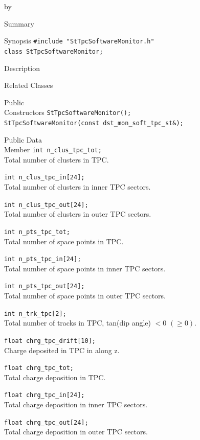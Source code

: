 \documentclass[twoside]{article}
\newcommand{\entrylabel}[1]{\mbox{\textbf{{#1}}}\hfil}%
\newenvironment{entry}
{\begin{list}{}%
    {\renewcommand{\makelabel}{\entrylabel}%
     \setlength{\labelwidth}{90pt}%
     \setlength{\leftmargin}{\labelwidth}
     \advance\leftmargin by \labelsep%
      }%
    }%
  {\end{list}}
\newcommand{\Entrylabel}[1]%
{\raisebox{0pt}[1ex][0pt]{\makebox[\labelwidth][l]%
    {\parbox[t]{\labelwidth}{\hspace{0pt}\textbf{{#1}}}}}}
\newenvironment{Entry}%
{\renewcommand{\entrylabel}{\Entrylabel}\begin{entry}}%
  {\end{entry}}
\begin{document}
\begin{Entry}
\item[Summary]
\item[Synopsis]
    \verb+#include "StTpcSoftwareMonitor.h"+\\
    \verb+class StTpcSoftwareMonitor;+\\
\item[Description]
\item[Related Classes]
\item[Public\\ Constructors]
    \verb+StTpcSoftwareMonitor();+\\
    \verb+StTpcSoftwareMonitor(const dst_mon_soft_tpc_st&);+\\
\item[Public Data\\ Member]
    \verb+int n_clus_tpc_tot;+\\
    Total number of clusters in TPC.
    
    \verb+int n_clus_tpc_in[24];+\\
    Total number of clusters in inner TPC sectors.
    
    \verb+int n_clus_tpc_out[24];+\\
    Total number of clusters in outer TPC sectors.
    
    \verb+int n_pts_tpc_tot;+\\
    Total number of space points in TPC.
    
    \verb+int n_pts_tpc_in[24];+\\
    Total number of space points in inner TPC sectors.
    
    \verb+int n_pts_tpc_out[24];+\\
    Total number of space points in outer TPC sectors.
    
    \verb+int n_trk_tpc[2];+\\
    Total number of tracks in TPC, tan(dip angle) $< 0$ $(\ge 0)$.
    
    \verb+float chrg_tpc_drift[10];+\\
    Charge deposited in TPC in along z.
    
    \verb+float chrg_tpc_tot;+\\
    Total charge deposition in TPC.
    
    \verb+float chrg_tpc_in[24];+\\
    Total charge deposition in inner TPC sectors.
    
    \verb+float chrg_tpc_out[24];+\\
    Total charge deposition in outer TPC sectors.
    

\end{Entry}
\end{document}
